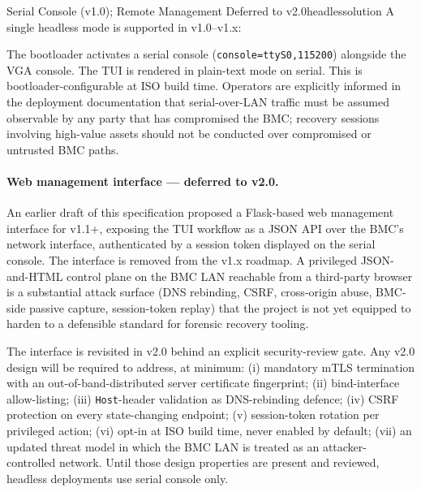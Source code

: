 \documentclass[11pt,a4paper]{report}
\begin{document}
\begin{solution}{Serial Console (v1.0); Remote Management Deferred to v2.0}{headlessolution}
A single headless mode is supported in v1.0--v1.x:

\begin{description}[noitemsep]
  \item[\textbf{Serial console mode (v1.0).}] The bootloader activates a serial console (\texttt{console=ttyS0,115200}) alongside the VGA console. The TUI is rendered in plain-text mode on serial. This is bootloader-configurable at ISO build time. Operators are explicitly informed in the deployment documentation that serial-over-LAN traffic must be assumed observable by any party that has compromised the BMC; recovery sessions involving high-value assets should not be conducted over compromised or untrusted BMC paths.
\end{description}

\paragraph{Web management interface --- deferred to v2.0.} An earlier draft of this specification proposed a Flask-based web management interface for v1.1+, exposing the TUI workflow as a JSON API over the BMC's network interface, authenticated by a session token displayed on the serial console. The interface is removed from the v1.x roadmap. A privileged JSON-and-HTML control plane on the BMC LAN reachable from a third-party browser is a substantial attack surface (DNS rebinding, CSRF, cross-origin abuse, BMC-side passive capture, session-token replay) that the project is not yet equipped to harden to a defensible standard for forensic recovery tooling.

The interface is revisited in v2.0 behind an explicit security-review gate. Any v2.0 design will be required to address, at minimum: (i) mandatory mTLS termination with an out-of-band-distributed server certificate fingerprint; (ii) bind-interface allow-listing; (iii) \texttt{Host}-header validation as DNS-rebinding defence; (iv) CSRF protection on every state-changing endpoint; (v) session-token rotation per privileged action; (vi) opt-in at ISO build time, never enabled by default; (vii) an updated threat model in which the BMC LAN is treated as an attacker-controlled network. Until those design properties are present and reviewed, headless deployments use serial console only.
\end{solution}
\end{document}
